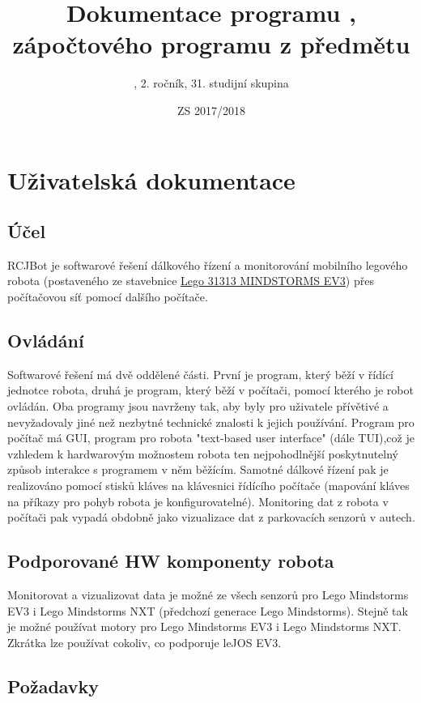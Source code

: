 \documentclass[12pt, ngerman]{article}
\title{Dokumentace programu \PROGRAM, zápočtového programu z předmětu \PREDMET}
\date{ZS 2017/2018}
\author{\AUTOR, 2. ročník, 31. studijní skupina}
\begin{document}
\maketitle
\newpage
{}

\section{Uživatelská dokumentace}
\subsection{Účel}
RCJBot je softwarové řešení dálkového řízení a monitorování mobilního legového robota (postaveného ze stavebnice \href{https://www.lego.com/en-us/mindstorms/products/mindstorms-ev3-31313}{Lego 31313 MINDSTORMS EV3}) přes počítačovou síť pomocí  dalšího počítače.

\subsection{Ovládání}
Softwarové řešení má dvě oddělené části. První je program, který běží v řídící jednotce robota, druhá je program, který běží v počítači, pomocí kterého je robot ovládán. Oba programy jsou navrženy tak, aby byly pro uživatele přívětivé a nevyžadovaly jiné než nezbytné technické znalosti k jejich používání. Program pro počítač má GUI, program pro robota "text-based user interface" (dále TUI),což je vzhledem k hardwarovým možnostem robota ten nejpohodlnější poskytnutelný způsob interakce s programem v něm běžícím. Samotné dálkové řízení pak je realizováno pomocí stisků kláves na klávesnici řídícího počítače (mapování kláves na příkazy pro pohyb robota je konfigurovatelné). Monitoring dat z robota v počítači pak vypadá obdobně jako vizualizace dat z parkovacích senzorů v autech.

\subsection{Podporované HW komponenty robota}
Monitorovat a vizualizovat data je možné ze všech senzorů pro Lego Mindstorms EV3 i Lego Mindstorms NXT (předchozí generace Lego Mindstorms). Stejně tak je možné používat motory pro Lego Mindstorms EV3 i Lego Mindstorms NXT. Zkrátka lze používat cokoliv, co podporuje leJOS EV3.

\subsection{Požadavky}
\end{document}
